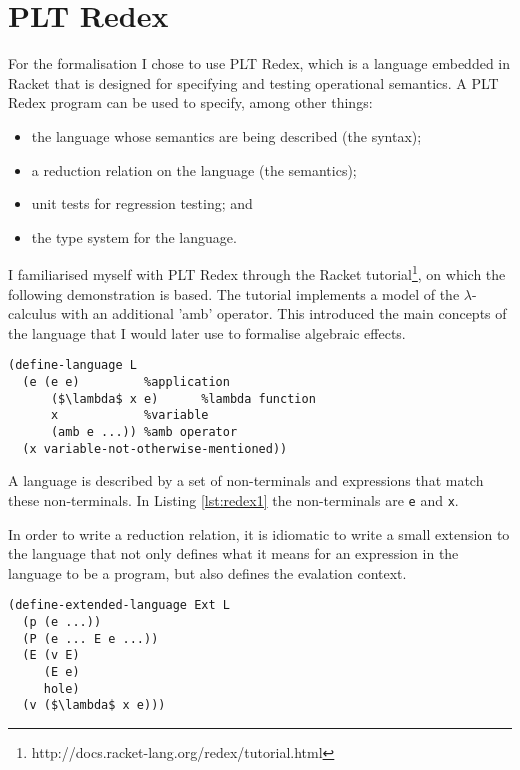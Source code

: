 \documentclass[12pt,a4paper,twoside,openright]{report}
\begin{document}
\section{PLT Redex}\label{prepplt}

For the formalisation I chose to use PLT Redex, which is a language embedded in Racket that is designed for specifying and testing operational semantics. A PLT Redex program can be used to specify, among other things:

\begin{itemize}
\item the language whose semantics are being described (the syntax);
\item a reduction relation on the language (the semantics);
\item unit tests for regression testing; and
\item the type system for the language.
\end{itemize}

I familiarised myself with PLT Redex through the Racket tutorial\footnote{http://docs.racket-lang.org/redex/tutorial.html}, on which the following demonstration is based. The tutorial implements a model of the $\lambda$-calculus with an additional 'amb' operator. This introduced the main concepts of the language that I would later use to formalise algebraic effects.

\begin{minipage}{\linewidth} \begin{lstlisting}[caption=Defining a language in PLT Redex,label={lst:redex1}]
(define-language L
  (e (e e)         %application
      ($\lambda$ x e)      %lambda function
      x            %variable
      (amb e ...)) %amb operator
  (x variable-not-otherwise-mentioned))
\end{lstlisting} \end{minipage}

A language is described by a set of non-terminals and expressions that match these non-terminals. In Listing \ref{lst:redex1} the non-terminals are \texttt{e} and \texttt{x}.

In order to write a reduction relation, it is idiomatic to write a small extension to the language that not only defines what it means for an expression in the language to be a program, but also defines the evalation context.

\begin{minipage}{\linewidth} \begin{lstlisting}[caption=An extended language based on L,label={lst:redex2}]
(define-extended-language Ext L
  (p (e ...))
  (P (e ... E e ...))
  (E (v E)
     (E e)
     hole)
  (v ($\lambda$ x e)))
\end{lstlisting} \end{minipage}
\end{document}

